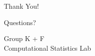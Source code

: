 \begin{frame}[plain]
    \begin{center}
        \vspace{2cm}

        {\Huge \textcolor{customred}{Thank You!}}

        \vspace{1cm}

        {\Large Questions?}

        \vspace{1.5cm}

        {\normalsize
        Group K + F \\
        Computational Statistics Lab
        }
    \end{center}
\end{frame}
